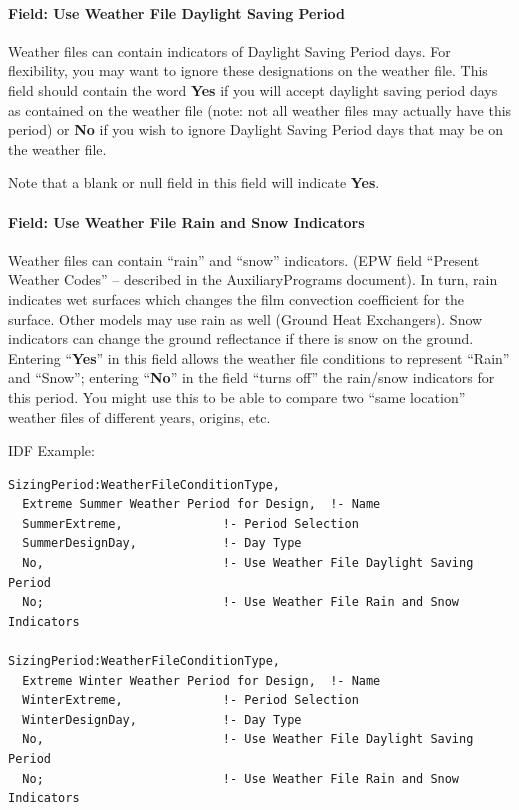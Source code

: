 \paragraph{Field: Use Weather File Daylight Saving Period}\label{field-use-weather-file-daylight-saving-period-1}

Weather files can contain indicators of Daylight Saving Period days. For flexibility, you may want to ignore these designations on the weather file. This field should contain the word \textbf{Yes} if you will accept daylight saving period days as contained on the weather file (note: not all weather files may actually have this period) or \textbf{No} if you wish to ignore Daylight Saving Period days that may be on the weather file.

Note that a blank or null field in this field will indicate \textbf{Yes}.

\paragraph{Field: Use Weather File Rain and Snow Indicators}\label{field-use-weather-file-rain-and-snow-indicators-1}

Weather files can contain ``rain'' and ``snow'' indicators. (EPW field ``Present Weather Codes'' -- described in the AuxiliaryPrograms document). In turn, rain indicates wet surfaces which changes the film convection coefficient for the surface. Other models may use rain as well (Ground Heat Exchangers). Snow indicators can change the ground reflectance if there is snow on the ground. Entering ``\textbf{Yes}'' in this field allows the weather file conditions to represent ``Rain'' and ``Snow''; entering ``\textbf{No}'' in the field ``turns off'' the rain/snow indicators for this period. You might use this to be able to compare two ``same location'' weather files of different years, origins, etc.

IDF Example:

\begin{lstlisting}
SizingPeriod:WeatherFileConditionType,
  Extreme Summer Weather Period for Design,  !- Name
  SummerExtreme,              !- Period Selection
  SummerDesignDay,            !- Day Type
  No,                         !- Use Weather File Daylight Saving Period
  No;                         !- Use Weather File Rain and Snow Indicators

SizingPeriod:WeatherFileConditionType,
  Extreme Winter Weather Period for Design,  !- Name
  WinterExtreme,              !- Period Selection
  WinterDesignDay,            !- Day Type
  No,                         !- Use Weather File Daylight Saving Period
  No;                         !- Use Weather File Rain and Snow Indicators
\end{lstlisting}

